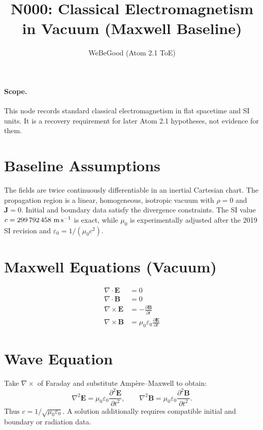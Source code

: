 \documentclass[11pt]{article}
\title{N000: Classical Electromagnetism in Vacuum (Maxwell Baseline)}
\author{WeBeGood (Atom 2.1 ToE)}
\date{}
\begin{document}
\maketitle

\paragraph{Scope.}
This node records standard classical electromagnetism in flat spacetime and SI units.
It is a recovery requirement for later Atom 2.1 hypotheses, not evidence for them.

\section{Baseline Assumptions}
The fields are twice continuously differentiable in an inertial Cartesian chart.
The propagation region is a linear, homogeneous, isotropic vacuum with
$\rho=0$ and $\mathbf{J}=0$. Initial and boundary data satisfy the divergence
constraints. The SI value $c=299\,792\,458\ {\rm m\,s^{-1}}$ is exact, while
$\mu_0$ is experimentally adjusted after the 2019 SI revision and
$\varepsilon_0=1/(\mu_0c^2)$.

\section{Maxwell Equations (Vacuum)}
\begin{align}
\nabla\cdot\mathbf{E} &= 0\\
\nabla\cdot\mathbf{B} &= 0\\
\nabla\times\mathbf{E} &= -\frac{\partial\mathbf{B}}{\partial t}\\
\nabla\times\mathbf{B} &= \mu_0\varepsilon_0\frac{\partial\mathbf{E}}{\partial t}
\end{align}

\section{Wave Equation}
Take $\nabla\times$ of Faraday and substitute Amp\`ere--Maxwell to obtain:
\begin{equation}
\nabla^2\mathbf{E} = \mu_0\varepsilon_0\frac{\partial^2\mathbf{E}}{\partial t^2},\qquad
\nabla^2\mathbf{B} = \mu_0\varepsilon_0\frac{\partial^2\mathbf{B}}{\partial t^2}.
\end{equation}
Thus $c = 1/\sqrt{\mu_0\varepsilon_0}$. A solution additionally requires
compatible initial and boundary or radiation data.
\end{document}
